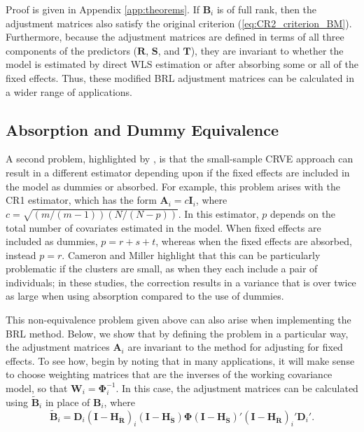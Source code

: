 \documentclass[12pt]{article}\usepackage[]{graphicx}\usepackage[]{color}
\newcommand{\bm}{\mathbf}
\newcommand{\bs}{\boldsymbol}
\begin{document}
Proof is given in Appendix \ref{app:theorems}. If $\bm{B}_i$ is of full rank, then the adjustment matrices also satisfy the original criterion (\ref{eq:CR2_criterion_BM}). Furthermore, because the adjustment matrices are defined in terms of all three components of the predictors ($\bm{R}$, $\bm{S}$, and $\bm{T}$), they are invariant to whether the model is estimated by direct WLS estimation or after absorbing some or all of the fixed effects. 
Thus, these modified BRL adjustment matrices can be calculated in a wider range of applications.

\subsection{Absorption and Dummy Equivalence}

A second problem, highlighted by \citet{Cameron2015practitioners}, is that the small-sample CRVE approach can result in a different estimator depending upon if the fixed effects are included in the model as dummies or absorbed. 
For example, this problem arises with the CR1 estimator, which has the form $\bm{A}_i = c\bm{I}_i$, where $c = \sqrt{(m/(m-1))(N/(N - p))}$. In this estimator, $p$ depends on the total number of covariates estimated in the model.
When fixed effects are included as dummies, $p = r + s + t$, whereas when the fixed effects are absorbed, instead $p = r$. 
Cameron and Miller highlight that this can be particularly problematic if the clusters are small, as when they each include a pair of individuals; in these studies, the correction results in a variance that is over twice as large when using absorption compared to the use of dummies.

This non-equivalence problem given above can also arise when implementing the BRL method.
Below, we show that by defining the problem in a particular way, the adjustment matrices $\bm{A}_i$ are invariant to the method for adjusting for fixed effects.
To see how, begin by noting that in many applications, it will make sense to choose weighting matrices that are the inverses of the working covariance model, so that $\bm{W}_i = \bs\Phi_i^{-1}$. In this case, the adjustment matrices can be calculated using $\bm{\tilde{B}}_i$ in place of $\bm{B}_i$, where
\begin{equation}
\label{eq:CR2_B_tilde}
\bm{\tilde{B}}_i = \bm{D}_i\left(\bm{I} - \bm{H_{\ddot{R}}}\right)_i \left(\bm{I} - \bm{H_{\ddot{S}}}\right) \bs\Phi \left(\bm{I} - \bm{H_{\ddot{S}}}\right)' \left(\bm{I} - \bm{H_{\ddot{R}}}\right)_i' \bm{D}_i'.
\end{equation}
\end{document}
